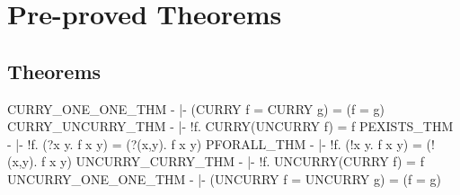 \chapter{Pre-proved Theorems}

\section{Theorems}
\THEOREM CURRY\_ONE\_ONE\_THM -
|- (CURRY f = CURRY g) = (f = g)
\ENDTHEOREM
\THEOREM CURRY\_UNCURRY\_THM -
|- !f. CURRY(UNCURRY f) = f
\ENDTHEOREM
\THEOREM PEXISTS\_THM -
|- !f. (?x y. f x y) = (?(x,y). f x y)
\ENDTHEOREM
\THEOREM PFORALL\_THM -
|- !f. (!x y. f x y) = (!(x,y). f x y)
\ENDTHEOREM
\THEOREM UNCURRY\_CURRY\_THM -
|- !f. UNCURRY(CURRY f) = f
\ENDTHEOREM
\THEOREM UNCURRY\_ONE\_ONE\_THM -
|- (UNCURRY f = UNCURRY g) = (f = g)
\ENDTHEOREM
